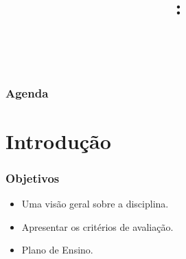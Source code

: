 \documentclass{beamer}
\title[\idsubjectcourseinstitution] %
{\texttt{\classnumber}: \classtitle}
\author[\authorcitation] %
{\authorname\inst{1} \\
	\texttt{\authoremail}
}
\institute[] %
{
  \inst{1}%
  \universityname \\
  \departmentname \\
  \citystatecountry
  \and
  \large
  \textbf{\coursename}
  
  \vspace{-1.0cm}
}
\date[\today] %
{\vspace{-1.5cm} \texttt{\subjectname}}
\begin{document}

{
	\begin{frame}
		\maketitle
	\end{frame}
}

\begin{frame}
\frametitle{Agenda}
\tableofcontents
\end{frame}
\section[Introdução]{Introdução}
\begin{frame}
\frametitle{Objetivos}
\justifying
\Large
\begin{itemize}
    \item Uma visão geral sobre a disciplina.
    \item Apresentar os critérios de avaliação.
    \item Plano de Ensino.
\end{itemize}
\end{frame}
\end{document}
